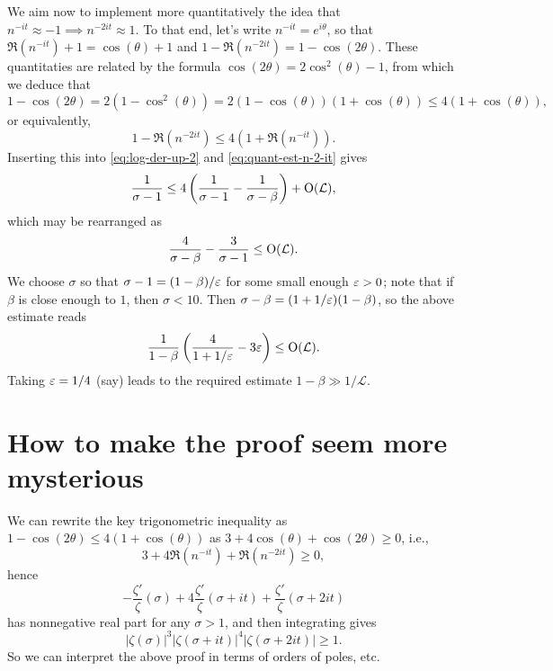 \documentclass[reqno]{amsart} 
\begin{document}
We aim now to implement more quantitatively the idea that $n^{-i t} \approx -1 \implies n^{- 2 i t} \approx 1$.  To that end, let's write $n^{-i t} = e^{i \theta}$, so that $\Re(n^{-it}) + 1 = \cos(\theta) + 1 $ and $1 - \Re(n^{-2 i t}) = 1 - \cos(2 \theta)$.  These quantitaties are related by the formula $\cos(2 \theta) = 2 \cos^2(\theta) - 1$, from which we deduce that
\begin{equation}\label{eq:}
  1 - \cos(2 \theta)
  =
  2 (1 - \cos^2(\theta))
  = 
  2 (1 - \cos(\theta))
  (1 + \cos(\theta))
  \leq
  4 (1 + \cos(\theta)),
\end{equation}
or equivalently,
\begin{equation}\label{eq:}
  1 - \Re(n^{-2 it}) \leq 4 (1 + \Re(n^{- it})).
\end{equation}
Inserting this into \eqref{eq:log-der-up-2} and \eqref{eq:quant-est-n-2-it} gives
\begin{equation}\label{eq:}
  \frac{1}{\sigma - 1}
  \leq 
  4
  \left(
    \frac{1}{\sigma - 1}
    -
    \frac{1}{\sigma - \beta }
  \right)
  +
  \operatorname{O}(\mathcal{L}),
\end{equation}
which may be rearranged as
\begin{equation}\label{eq:}
  \frac{4}{\sigma - \beta }
  -
  \frac{3}{\sigma - 1}
  \leq 
  \operatorname{O}(\mathcal{L}).
\end{equation}
We choose $\sigma$ so that $\sigma - 1 = (1 - \beta)/\varepsilon$ for some small enough $\varepsilon > 0$; note that if $\beta$ is close enough to $1$, then $\sigma < 10$.  Then $\sigma - \beta = (1 + 1/\varepsilon) (1 - \beta)$, so the above estimate reads
\begin{equation}\label{eq:}
  \frac{1}{1 - \beta }
  \left(
    \frac{4}{1 + 1/\varepsilon }
    -
    3 \varepsilon 
  \right)
  \leq 
  \operatorname{O}(\mathcal{L}).
\end{equation}
Taking $\varepsilon = 1/4$ (say) leads to the required estimate $1 - \beta \gg 1/ \mathcal{L}$.
\section{How to make the proof seem more mysterious}
\label{sec:orgb1b6469}
We can rewrite the key trigonometric inequality as $1 - \cos(2 \theta) \leq 4 (1 + \cos(\theta))$ as $3 + 4 \cos(\theta) + \cos(2 \theta) \geq 0$, i.e.,
\begin{equation*}
  3 + 4 \Re(n^{-i t}) + \Re(n^{-2 it}) \geq 0,
\end{equation*}
hence
\begin{equation*}
  - \frac{\zeta '}{ \zeta }(\sigma) + 4 \frac{\zeta '}{ \zeta }(\sigma+it) + \frac{\zeta '}{ \zeta }(\sigma+2 it)
\end{equation*}
has nonnegative real part for any $\sigma > 1$, and then integrating gives
\begin{equation*}
  |\zeta(\sigma)|^3 |\zeta(\sigma + it)|^4 |\zeta(\sigma + 2 it)| \geq 1.
\end{equation*}
So we can interpret the above proof in terms of orders of poles, etc.


{} 
\end{document}
